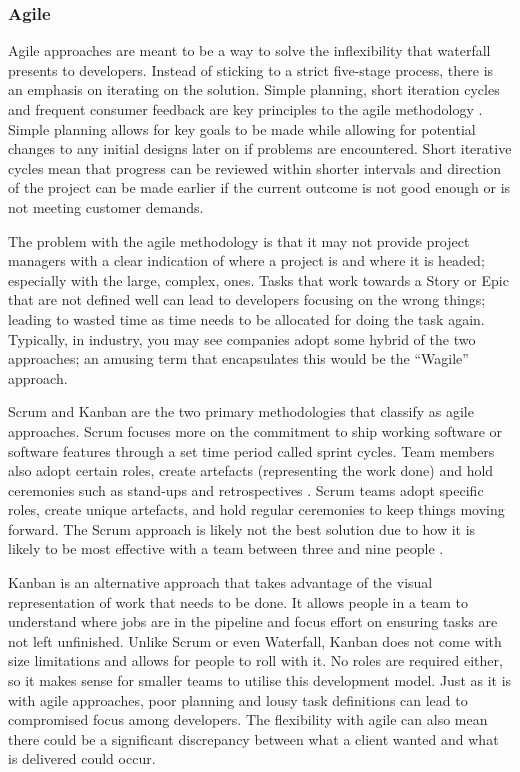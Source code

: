 \subsubsection*{Agile}
Agile approaches are meant to be a way to solve the inflexibility that waterfall presents to developers. 
Instead of sticking to a strict five-stage process, there is an emphasis on iterating on the solution. 
Simple planning, short iteration cycles and frequent consumer feedback are key principles to the agile methodology \cite{huo2004software}.
Simple planning allows for key goals to be made while allowing for potential changes to any initial designs later on if problems are encountered.
Short iterative cycles mean that progress can be reviewed within shorter intervals and direction of the project can be made earlier if
the current outcome is not good enough or is not meeting customer demands.

The problem with the agile methodology is that it may not provide project managers with a clear indication of where a project is and where it is 
headed; especially with the large, complex, ones.
Tasks that work towards a Story or Epic that are not defined well can lead to developers focusing on the wrong things; leading to wasted time 
as time needs to be allocated for doing the task again.
Typically, in industry, you may see companies adopt some hybrid of the two approaches; an amusing term that encapsulates this would
be the ``Wagile'' approach. 

Scrum and Kanban are the two primary methodologies that classify as agile approaches.
Scrum focuses more on the commitment to ship working software or software features through a set time period called sprint cycles.
Team members also adopt certain roles, create artefacts (representing the work done) and hold ceremonies such as stand-ups and
retrospectives \cite{max2019kanbanvscrum}.
Scrum teams adopt specific roles, create unique artefacts, and hold regular ceremonies to keep things moving forward. 
The Scrum approach is likely not the best solution due to how it is likely to be most effective with a team between three and
nine people \cite{sutherlandschwaber2017scrum}. 

Kanban is an alternative approach that takes advantage of the visual representation of work that needs to be done.
It allows people in a team to understand where jobs are in the pipeline and focus effort on ensuring tasks are not left unfinished.
Unlike Scrum or even Waterfall, Kanban does not come with size limitations and allows for people to roll with it.
No roles are required either, so it makes sense for smaller teams to utilise this development model.
Just as it is with agile approaches, poor planning and lousy task definitions can lead to compromised focus among developers.
The flexibility with agile can also mean there could be a significant discrepancy between what a client wanted and what is delivered could occur.

